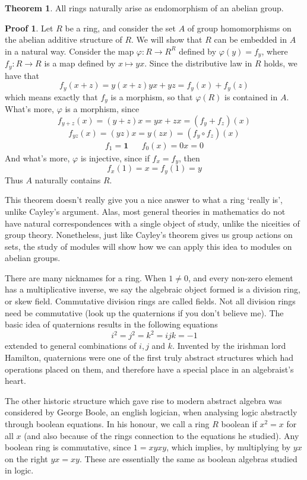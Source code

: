 \documentclass[12pt]{amsbook}
\theoremstyle{definition}
\newtheorem{theorem}{Theorem}[chapter]
\newtheorem*{prf}{Proof}
\begin{document}
\begin{theorem}
    All rings naturally arise as endomorphism of an abelian group.
\end{theorem}
\begin{prf}
    Let $R$ be a ring, and consider the set $A$ of group homomorphisms on the abelian additive structure of $R$. We will show that $R$ can be embedded in $A$ in a natural way. Consider the map $\varphi: R \to R^R$ defined by $\varphi(y) = f_y$, where $f_y:R \to R$ is a map defined by $x \mapsto yx$. Since the distributive law in $R$ holds, we have that
    \[ f_y(x + z) = y(x + z) yx + yz = f_y(x) + f_y(z) \]
    which means exactly that $f_y$ is a morphism, so that $\varphi(R)$ is contained in $A$. What's more, $\varphi$ is a morphism, since
    \[ f_{y + z}(x) = (y + z)x = yx + zx = (f_y + f_z)(x) \]
    \[ f_{yz}(x) = (yz)x = y(zx) = (f_y \circ f_z)(x) \]
    \begin{align*}
        f_1 = \mathbf{1} && f_0(x) = 0x = 0
    \end{align*}
    And what's more, $\varphi$ is injective, since if $f_x = f_y$, then
    \[ f_x(1) = x = f_y(1) = y \]
    Thus $A$ naturally contains $R$.
\end{prf}

This theorem doesn't really give you a nice answer to what a ring `really is', unlike Cayley's argument. Alas, most general theories in mathematics do not have natural correspondences with a single object of study, unlike the niceities of group theory. Nonetheless, just like Cayley's theorem gives us group actions on sets, the study of modules will show how we can apply this idea to modules on abelian groups.

There are many nicknames for a ring. When $1 \neq 0$, and every non-zero element has a multiplicative inverse, we say the algebraic object formed is a division ring, or skew field. Commutative division rings are called fields. Not all division rings need be commutative (look up the quaternions if you don't believe me). The basic idea of quaternions results in the following equations
%
\[ i^2 = j^2 = k^2 = ijk = -1 \]
%
extended to general combinations of $i,j$ and $k$. Invented by the irishman lord Hamilton, quaternions were one of the first truly abstract structures which had operations placed on them, and therefore have a special place in an algebraist's heart.

The other historic structure which gave rise to modern abstract algebra was considered by George Boole, an english logician, when analysing logic abstractly through boolean equations. In his honour, we call a ring $R$ boolean if $x^2 = x$ for all $x$ (and also because of the rings connection to the equations he studied). Any boolean ring is commutative, since $1 = xyxy$, which implies, by multiplying by $yx$ on the right $yx = xy$. These are essentially the same as boolean algebras studied in logic.
\end{document}
